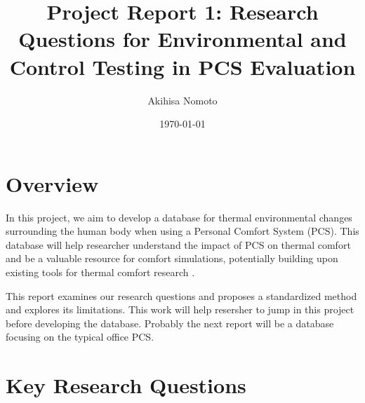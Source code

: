 \documentclass[11pt]{article}
\begin{document}
\title{Project Report 1: Research Questions for Environmental and Control Testing in PCS Evaluation}
\author{Akihisa Nomoto}
\date{\today}
\maketitle

%

\section*{Overview}

In this project, we aim to develop a database for thermal environmental changes surrounding the human body when using a Personal Comfort System (PCS).
This database will help researcher understand the impact of PCS on thermal comfort and be a valuable resource for comfort simulations, potentially building upon existing tools for thermal comfort research \cite{Tartarini2020a}.

This report examines our research questions and proposes a standardized method and explores its limitations. This work will help resersher to jump in this project before developing the database.
Probably the next report will be a database focusing on the typical office PCS.


\section*{Key Research Questions}
\end{document}
